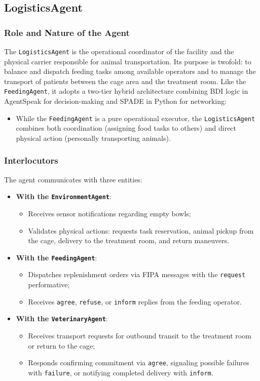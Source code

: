 \documentclass{article}
\renewcommand{\_}{\oldtextunderscore\allowbreak}
\begin{document}
\subsection{LogisticsAgent}
\subsubsection{Role and Nature of the Agent}
The \texttt{LogisticsAgent} is the operational coordinator of the facility and the physical carrier responsible for animal transportation. Its purpose is twofold: to balance and dispatch feeding tasks among available operators and to manage the transport of patients between the cage area and the treatment room.
Like the \texttt{FeedingAgent}, it adopts a two-tier hybrid architecture combining BDI logic in AgentSpeak for decision-making and SPADE in Python for networking:
\begin{itemize}
    \item While the \texttt{FeedingAgent} is a pure operational executor, the \texttt{LogisticsAgent} combines both coordination (assigning food tasks to others) and direct physical action (personally transporting animals).
\end{itemize}
\subsubsection{Interlocutors}
The agent communicates with three entities:
\begin{itemize}
    \item \textbf{With the \texttt{EnvironmentAgent}}:
    \begin{itemize}
        \item Receives sensor notifications regarding empty bowls;
        \item Validates physical actions: requests task reservation, animal pickup from the cage, delivery to the treatment room, and return maneuvers.
    \end{itemize}
    \item \textbf{With the \texttt{FeedingAgent}}:
    \begin{itemize}
        \item Dispatches replenishment orders via FIPA messages with the \texttt{request} performative;
        \item Receives \texttt{agree}, \texttt{refuse}, or \texttt{inform} replies from the feeding operator.
    \end{itemize}
    \item \textbf{With the \texttt{VeterinaryAgent}}:
    \begin{itemize}
        \item Receives transport requests for outbound transit to the treatment room or return to the cage;
        \item Responds confirming commitment via \texttt{agree}, signaling possible failures with \texttt{failure}, or notifying completed delivery with \texttt{inform}.
    \end{itemize}
\end{itemize}
\end{document}
